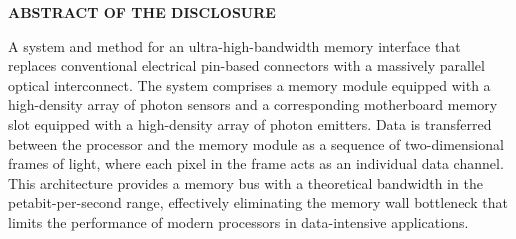 \documentclass[11pt,letterpaper]{article}
\begin{document}
\thispagestyle{empty}

\begin{center}
    \textbf{\large ABSTRACT OF THE DISCLOSURE}
\end{center}

\vspace{0.6cm}

A system and method for an ultra-high-bandwidth memory interface that replaces conventional electrical pin-based connectors with a massively parallel optical interconnect. The system comprises a memory module equipped with a high-density array of photon sensors and a corresponding motherboard memory slot equipped with a high-density array of photon emitters. Data is transferred between the processor and the memory module as a sequence of two-dimensional frames of light, where each pixel in the frame acts as an individual data channel. This architecture provides a memory bus with a theoretical bandwidth in the petabit-per-second range, effectively eliminating the memory wall bottleneck that limits the performance of modern processors in data-intensive applications.
\end{document}
